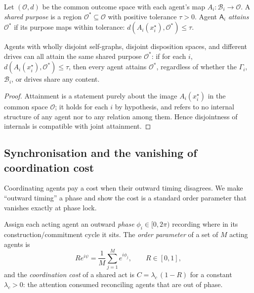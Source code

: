 \documentclass[11pt,twocolumn,a4paper]{article}
\newcommand{\Agent}{\mathsf{A}}
\newcommand{\Self}{\Gamma}          %
\newcommand{\Beh}{\mathcal{B}}       %
\newcommand{\Purp}{x^{\star}}        %
\newcommand{\Ord}{R}                 %
\newcommand{\phase}{\phi}
\newcommand{\Out}{\mathcal{O}}       %
\newcommand{\tol}{\tau}
\newcommand{\dist}{d}
\begin{document}
\begin{definition}
\label{def:shared}
Let $(\Out,\dist)$ be the common outcome space with each agent's map
$A_i:\Beh_i\to\Out$. A \emph{shared purpose} is a region
$\Out^\ast\subseteq\Out$ with positive tolerance $\tol>0$. Agent
$\Agent_i$ \emph{attains} $\Out^\ast$ if its purpose maps within
tolerance: $\dist(A_i(\Purp_i),\Out^\ast)\le\tol$.
\end{definition}

\begin{theorem}
\label{thm:coord}
Agents with wholly disjoint self-graphs, disjoint disposition spaces, and
different drives can all attain the same shared purpose $\Out^\ast$: if for
each $i$, $\dist(A_i(\Purp_i),\Out^\ast)\le\tol$, then every agent attains
$\Out^\ast$, regardless of whether the $\Self_i$, $\Beh_i$, or drives share
any content.
\end{theorem}

\begin{proof}
Attainment is a statement purely about the image $A_i(\Purp_i)$ in the
common space $\Out$; it holds for each $i$ by hypothesis, and refers to no
internal structure of any agent nor to any relation among them. Hence
disjointness of internals is compatible with joint attainment.
\end{proof}

\subsection{Synchronisation and the vanishing of coordination cost}

Coordinating agents pay a cost when their outward timing disagrees. We
make ``outward timing'' a phase and show the cost is a standard order
parameter that vanishes exactly at phase lock.

\begin{definition}
\label{def:orderparam}
Assign each acting agent an outward \emph{phase} $\phase_i\in[0,2\pi)$
recording where in its construction/commitment cycle it sits. The
\emph{order parameter} of a set of $M$ acting agents is
\[
\Ord e^{i\psi}=\frac1M\sum_{j=1}^M e^{i\phase_j},\qquad \Ord\in[0,1],
\]
and the \emph{coordination cost} of a shared act is
$C=\lambda_c\,(1-\Ord)$ for a constant $\lambda_c>0$: the attention
consumed reconciling agents that are out of phase.
\end{definition}
\end{document}
